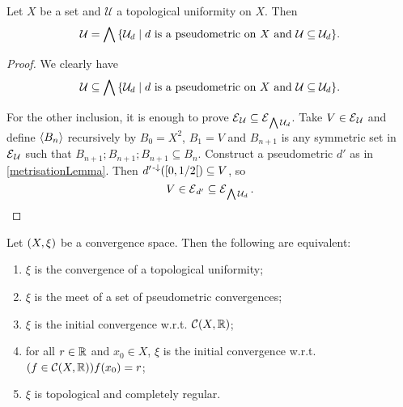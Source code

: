 \begin{proposition} \label{topologicalUniformityGeneratedByPseudometrics}
Let $X$ be a set and $\mathcal{U}$ a topological uniformity on $X$. Then 
\[ \mathcal{U} =  \bigwedge \setbuilder{\mathcal{U}_d}{\text{$d$ is a pseudometric on $X$ and $\mathcal{U}\subseteq \mathcal{U}_d$}}. \]
\end{proposition}
\begin{proof}
We clearly have
\[ \mathcal{U} \subseteq \bigwedge \setbuilder{\mathcal{U}_d}{\text{$d$ is a pseudometric on $X$ and $\mathcal{U}\subseteq \mathcal{U}_d$}}. \]

For the other inclusion, it is enough to prove $\operatorname{\mathcal{E}}_\mathcal{U} \subseteq \operatorname{\mathcal{E}}_{\bigwedge \mathcal{U}_d}$. Take $V\in \operatorname{\mathcal{E}}_\mathcal{U}$ and define $\left\langle B_n \right\rangle$ recursively by $B_0 = X^2$, $B_1 = V$ and $B_{n+1}$ is any symmetric set in $\operatorname{\mathcal{E}}_\mathcal{U}$ such that $B_{n+1};B_{n+1};B_{n+1} \subseteq B_n$. Construct a pseudometric $d'$ as in \ref{metrisationLemma}. Then $d^{\prime\preimf}(\interval[co]{0,1/2})\subseteq V$, so
\[ V \in \operatorname{\mathcal{E}}_{d'} \subseteq \operatorname{\mathcal{E}}_{\bigwedge \mathcal{U}_d}. \]
\end{proof}
\begin{corollary} \label{topologicallyUniformisableEquivalents}
Let $\sSet{X,\xi}$ be a convergence space. Then the following are equivalent:
\begin{enumerate}
\item $\xi$ is the convergence of a topological uniformity;
\item $\xi$ is the meet of a set of pseudometric convergences;
\item $\xi$ is the initial convergence w.r.t. $\operatorname{\mathcal{C}}(X,\mathbb{R})$;
\item for all $r\in \mathbb{R}$ and $x_0\in X$, $\xi$ is the initial convergence w.r.t. $\sSet{f \in \cont(X,\R)}{f(x_0) = r}$;
\item $\xi$ is topological and completely regular.
\end{enumerate}
\end{corollary}
